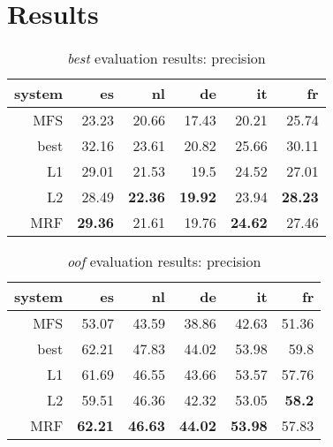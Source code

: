 \documentclass[11pt,letterpaper]{article}
\begin{document}
\section{Results}
\begin{table}[t!]
  \begin{center}
    \begin{tabular}{|r|r|r|r|r|r|}
      \hline
      system   & es    & nl    & de    &  it   & fr \\
      \hline
   MFS  & 23.23          & 20.66          & 17.43          & 20.21          & 25.74 \\
   best & 32.16          & 23.61          & 20.82          & 25.66          & 30.11 \\
      \hline
            L1 & 29.01          & 21.53          & 19.5           & 24.52          & 27.01 \\
            L2 & 28.49          & \textbf{22.36} & \textbf{19.92} & 23.94          & \textbf{28.23} \\
           MRF & \textbf{29.36} & 21.61          & 19.76          & \textbf{24.62} & 27.46 \\
      \hline
    \end{tabular}
  \caption{\emph{best} evaluation results: precision}
  \label{table:resultsbest}
  \end{center}
\end{table}

\begin{table}[t!]
  \begin{center}
    \begin{tabular}{|r|r|r|r|r|r|}
      \hline
      system   & es    & nl    & de    &  it   & fr \\
      \hline
    MFS & 53.07          & 43.59              & 38.86          & 42.63          & 51.36 \\
   best & 62.21          & 47.83              & 44.02          & 53.98          & 59.8 \\
      \hline
           L1  & 61.69          & 46.55              & 43.66          & 53.57          & 57.76 \\
           L2  & 59.51          & 46.36              & 42.32          & 53.05          & \textbf{58.2} \\
           MRF & \textbf{62.21} & \textbf{46.63}     & \textbf{44.02} & \textbf{53.98} & 57.83 \\
      \hline
    \end{tabular}
  \caption{\emph{oof} evaluation results: precision}
  \label{table:resultsbest}
  \end{center}
\end{table}
\end{document}
